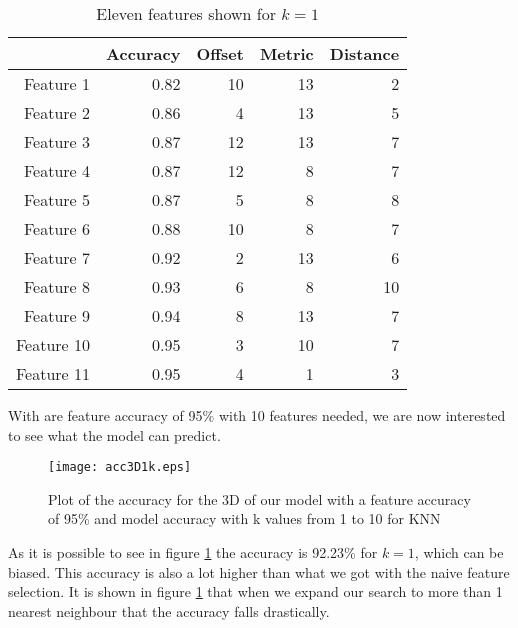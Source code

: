 \begin{table}[H]
  \centering
    \begin{tabular}{|r|r|r|r|r|}
    \hline
          & Accuracy & Offset & Metric & Distance \\
    \hline
    Feature 1 & 0.82  & 10    & 13    & 2 \\
    \hline
    Feature 2 & 0.86  & 4     & 13    & 5 \\
    \hline
    Feature 3 & 0.87  & 12    & 13    & 7 \\
    \hline
    Feature 4 & 0.87  & 12    & 8     & 7 \\
    \hline
    Feature 5 & 0.87  & 5     & 8     & 8 \\
    \hline
    Feature 6 & 0.88  & 10    & 8     & 7 \\
    \hline
    Feature 7 & 0.92  & 2     & 13    & 6 \\
    \hline
    Feature 8 & 0.93  & 6     & 8     & 10 \\
    \hline
    Feature 9 & 0.94  & 8     & 13    & 7 \\
    \hline
    Feature 10 & 0.95  & 3     & 10    & 7 \\
    \hline
    Feature 11 & 0.95  & 4     & 1     & 3 \\
    \hline
    \end{tabular}%
  \caption{Eleven features shown for $k=1$}\label{tab:Features3d1k}%
\end{table}%

With are feature accuracy of 95\% with 10 features needed, we are now interested to see what the model can predict.

\begin{figure}[H]
  \centering
  \texttt{[image: acc3D1k.eps]}
  \caption{Plot of the accuracy for the 3D of our model with a feature accuracy of 95\% and model accuracy with k values from 1 to 10 for KNN}\label{fig:Features3d1k}
\end{figure}

As it is possible to see in figure \ref{fig:Features3d1k} the accuracy is 92.23\% for $k=1$, which can be biased. This accuracy is also a lot higher than what we got with the naive feature selection. It is shown in figure \ref{fig:Features3d1k} that when we expand our search to more than 1 nearest neighbour that the accuracy falls drastically.

